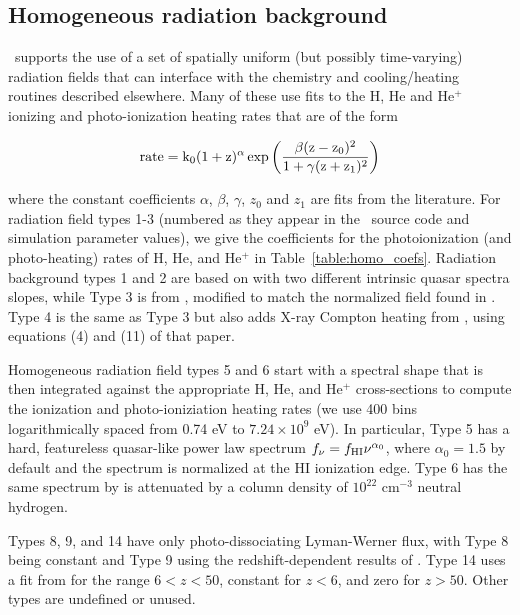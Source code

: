\subsection{Homogeneous radiation background}
\label{sec.num.rad-homogeneous}

\enzo\ supports the use of a set of spatially uniform (but possibly
time-varying) radiation fields that can interface with the chemistry
and cooling/heating routines described elsewhere.  Many of these use
fits to the H, He and He$^+$ ionizing and photo-ionization heating
rates that are of the form

\begin{equation}
\rm{rate} = k_0  (1+z)^{\alpha}  \exp{\left( \frac{\beta (z-z_0)^2 }{1 + \gamma  (z+z_1)^2} \right)}
\label{eq:homo_rad_template}
\end{equation}

where the constant coefficients $\alpha$, $\beta$, $\gamma$, $z_0$ and
$z_1$ are fits from the literature.  For radiation field types 1-3
(numbered as they appear in the \enzo\ source code and simulation
parameter values), we
give the coefficients for the photoionization (and photo-heating)
rates of H, He, and He$^+$ in Table~\ref{table:homo_coefs}.  Radiation
background types 1
and 2 are based on \citet{1996ApJ...461...20H} with two different
intrinsic quasar spectra slopes, while Type 3 is from
\citet{2012ApJ...746..125H}, modified to match the normalized field
found in \citet{Kirkman05}.  Type 4 is the same as Type 3 but also
adds X-ray Compton heating from \citet{MadauEfstathiou99}, using
equations (4) and (11) of that paper.

Homogeneous radiation field types 5 and 6 start with a spectral shape
that is then integrated against the appropriate H, He, and He$^+$
cross-sections to compute the ionization and photo-ioniziation heating
rates (we use 400 bins logarithmically spaced from 0.74 eV to $7.24
\times 10^9$ eV).  In particular, Type 5 has a hard, featureless
quasar-like power law spectrum $f_{\nu} = f_{\rm HI} \nu^{\alpha_0}$,
where $\alpha_0 = 1.5$ by default and the spectrum is normalized at
the HI ionization edge.  Type 6 has the same spectrum by is attenuated
by a column density of $10^{22}$ cm$^{-3}$ neutral hydrogen.  

Types 8, 9, and 14 have only photo-dissociating Lyman-Werner flux,
with Type 8 being constant and Type 9 using the redshift-dependent
results of \citet{TrentiStiavelli09}.  Type 14 uses a fit from
\citet{WiseAbel05} for the range $6 < z < 50$, constant for $z<6$, and
zero for $z > 50$.  Other types are undefined or unused.

